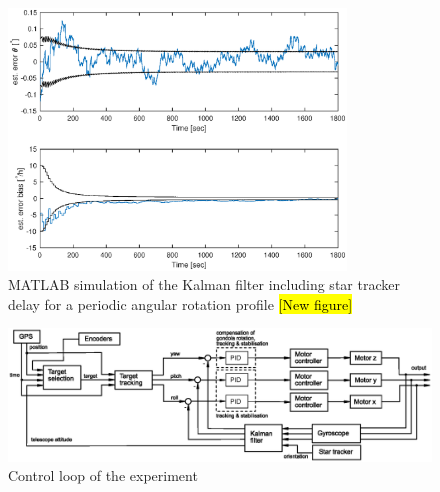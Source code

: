 \begin{figure}[htb]
    \centering
    \includegraphics[width = 0.8\textwidth]{4-experiment-design/img/software/kf_10_8_cos_3_1800.eps}
    \caption{MATLAB simulation of the Kalman filter including star tracker delay for a periodic angular rotation profile \hl{[New figure]}}
    \label{fig::software::Kalman_filter_delay_2}
\end{figure}

\newpage
\begin{landscape}
    \begin{figure}
        \includegraphics[width=\linewidth]{4-experiment-design/img/software/Control_loop.eps}
        \caption{Control loop of the experiment}
        \label{fig::software::control_loop}
    \end{figure}
\end{landscape}


\raggedbottom
